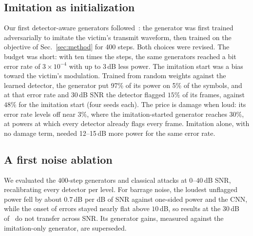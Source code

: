 \subsection{Imitation as initialization}
Our first detector-aware generators followed~\cite{11184988}: the generator was first trained adversarially to imitate the victim's transmit waveform, then trained on the objective of Sec.~\ref{sec:method} for 400 steps.
Both choices were revised.
The budget was short: with ten times the steps, the same generators reached a bit error rate of $3\times10^{-4}$ with up to 3\,dB less power.
The imitation start was a bias toward the victim's modulation.
Trained from random weights against the learned detector, the generator put 97\% of its power on 5\% of the symbols, and at that error rate and 30\,dB SNR the detector flagged $15\%$ of its frames, against $48\%$ for the imitation start (four seeds each).
The price is damage when loud: its error rate levels off near $3\%$, where the imitation-started generator reaches $30\%$, at powers at which every detector already flags every frame.
Imitation alone, with no damage term, needed 12--15\,dB more power for the same error rate.

\subsection{A first noise ablation}
We evaluated the $400$-step generators and classical attacks at $0$--$40$\,dB SNR, recalibrating every detector per level.
For barrage noise, the loudest unflagged power fell by about $0.7$\,dB per dB of SNR against one-sided power and the CNN, while the onset of errors stayed nearly flat above $10$\,dB, so results at the $30$\,dB of~\cite{11184988} do not transfer across SNR.
Its generator gains, measured against the imitation-only generator, are superseded.

